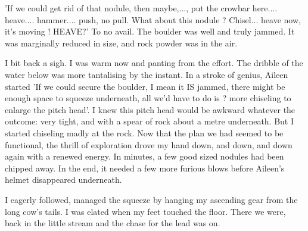 'If we could get rid of that nodule, then maybe,..., put the crowbar here.... heave.... hammer.... push, no pull. What about this nodule ? Chisel... heave now, it's moving ! HEAVE?' 
To no avail. The boulder was well and truly jammed. It was marginally reduced in size, and rock powder was in the air.

I bit back a sigh. I was warm now and panting from the effort. The dribble of the water below was more tantalising by the instant. In a stroke of genius, Aileen started 'If we could secure the boulder, I mean it IS jammed, there might be enough space to squeeze underneath, all we'd have to do is ? more chiseling to enlarge the pitch head'.
I knew this pitch head would be awkward whatever the outcome: very tight, and with a spear of rock about a metre underneath. But I started chiseling madly at the rock. Now that the plan we had seemed to be functional, the thrill of exploration drove my hand down, and down, and down again with a renewed energy. In minutes, a few good sized nodules had been chipped away. In the end, it needed a few more furious blows before Aileen's helmet disappeared underneath.

I eagerly followed, managed the squeeze by hanging my ascending gear from the long cow's tails. I was elated when my feet touched the floor. There we were, back in the little stream and the chase for the lead was on.



